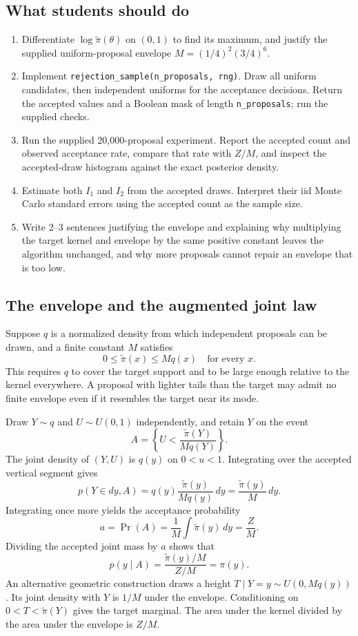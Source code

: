 \documentclass[11pt,a4paper]{article}
\begin{document}
\subsection{What students should do}
\begin{enumerate}
\item Differentiate $\log\widetilde\pi(\theta)$ on $(0,1)$ to find its
maximum, and justify the supplied uniform-proposal envelope
$M=(1/4)^2(3/4)^6$.
\item Implement \texttt{rejection\_sample(n\_proposals, rng)}. Draw all
uniform candidates, then independent uniforms for the acceptance decisions.
Return the accepted values and a Boolean mask of length
\texttt{n\_proposals}; run the supplied checks.
\item Run the supplied 20,000-proposal experiment. Report the accepted count
and observed acceptance rate, compare that rate with $Z/M$, and inspect the
accepted-draw histogram against the exact posterior density.
\item Estimate both $I_1$ and $I_2$ from the accepted draws. Interpret their
iid Monte Carlo standard errors using the accepted count as the sample size.
\item Write 2--3 sentences justifying the envelope and explaining why
multiplying the target kernel and envelope by the same positive constant
leaves the algorithm unchanged, and why more proposals cannot repair an
envelope that is too low.
\end{enumerate}

\subsection{The envelope and the augmented joint law}
Suppose $q$ is a normalized density from which independent proposals can be
drawn, and a finite constant $M$ satisfies
\[
 0\le\widetilde\pi(x)\le Mq(x)\quad\text{for every }x.
\]
This requires $q$ to cover the target support and to be large enough relative
to the kernel everywhere. A proposal with lighter tails than the target may
admit no finite envelope even if it resembles the target near its mode.

Draw $Y\sim q$ and $U\sim U(0,1)$ independently, and retain $Y$ on the event
\[
 A=\left\{U<\frac{\widetilde\pi(Y)}{Mq(Y)}\right\}.
\]
The joint density of $(Y,U)$ is $q(y)$ on $0<u<1$. Integrating over the
accepted vertical segment gives
\[
 p(Y\in dy,A)=q(y)\frac{\widetilde\pi(y)}{Mq(y)}\,dy
 =\frac{\widetilde\pi(y)}M\,dy.
\]
Integrating once more yields the acceptance probability
\[
 a=\Pr(A)=\frac1M\int\widetilde\pi(y)\,dy=\frac ZM.
\]
Dividing the accepted joint mass by $a$ shows that
\[
 p(y\mid A)=\frac{\widetilde\pi(y)/M}{Z/M}=\pi(y).
\]
An alternative geometric construction draws a height
$T\mid Y=y\sim U(0,Mq(y))$. Its joint density with $Y$ is $1/M$ under the
envelope. Conditioning on $0<T<\widetilde\pi(Y)$ gives the target marginal.
The area under the kernel divided by the area under the envelope is $Z/M$.
\end{document}
